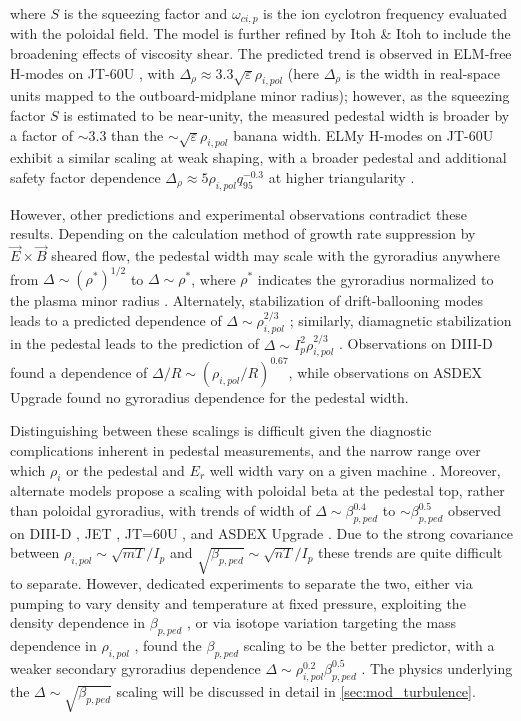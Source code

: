 \noindent where $S$ is the squeezing factor and $\omega_{ci,p}$ is the ion cyclotron frequency evaluated with the poloidal field.  The model is further refined by Itoh \& Itoh \cite{Itoh1996} to include the broadening effects of viscosity shear.  The predicted trend is observed in ELM-free H-modes on JT-60U \cite{Hatae1998}, with $\Delta_\rho \approx 3.3 \sqrt{\varepsilon} \rho_{i,pol}$ (here $\Delta_\rho$ is the width in real-space units mapped to the outboard-midplane minor radius); however, as the squeezing factor $S$ is estimated to be near-unity, the measured pedestal width is broader by a factor of $\sim 3.3$ than the $\sim \sqrt{\varepsilon} \rho_{i,pol}$ banana width.  ELMy H-modes on JT-60U exhibit a similar scaling at weak shaping, with a broader pedestal and additional safety factor dependence $\Delta_\rho \approx 5 \rho_{i,pol} q_{95}^{-0.3}$ at higher triangularity \cite{Kamada1999}.

However, other predictions and experimental observations contradict these results.  Depending on the calculation method of growth rate suppression by $\vec{E}\times\vec{B}$ sheared flow, the pedestal width may scale with the gyroradius anywhere from $\Delta \sim \left(\rho^*\right)^{1/2}$ to $\Delta \sim \rho^*$, where $\rho^*$ indicates the gyroradius normalized to the plasma minor radius \cite{Onjun2002,Beurskens2011}.  Alternately, stabilization of drift-ballooning modes leads to a predicted dependence of $\Delta \sim \rho_{i,pol}^{2/3}$ \cite{Wilson1997}; similarly, diamagnetic stabilization in the pedestal leads to the prediction of $\Delta \sim I_p^2 \rho_{i,pol}^{2/3}$ \cite{Rogers1999}.  Observations on DIII-D \cite{Osborne1998} found a dependence of $\Delta/R \sim (\rho_{i,pol}/R)^{0.67}$, while observations on ASDEX Upgrade \cite{Beurskens2011,Suttrop2000a} found no gyroradius dependence for the pedestal width.

Distinguishing between these scalings is difficult given the diagnostic complications inherent in pedestal measurements, and the narrow range over which $\rho_i$ or the pedestal and $E_r$ well width vary on a given machine \cite{Gohil1998,Maggi2010}.  Moreover, alternate models propose a scaling with poloidal beta at the pedestal top, rather than poloidal gyroradius, with trends of width of $\Delta \sim \beta_{p,ped}^{0.4}$ to $\sim \beta_{p,ped}^{0.5}$ observed on DIII-D \cite{Osborne1998,Groebner1998a}, JET \cite{Maggi2010}, JT=60U \cite{Urano2008}, and ASDEX Upgrade \cite{Beurskens2011}.  Due to the strong covariance between $\rho_{i,pol} \sim \sqrt{mT}/I_p$ and $\sqrt{\beta_{p,ped}} \sim \sqrt{nT}/I_p$ these trends are quite difficult to separate.  However, dedicated experiments to separate the two, either via pumping to vary density and temperature at fixed pressure, exploiting the density dependence in $\beta_{p,ped}$ \cite{Osborne1998}, or via isotope variation targeting the mass dependence in $\rho_{i,pol}$ \cite{Urano2008,Saibene1999}, found the $\beta_{p,ped}$ scaling to be the better predictor, with a weaker secondary gyroradius dependence $\Delta \sim \rho_{i,pol}^{0.2} \beta_{p,ped}^{0.5}$ \cite{Urano2008,Maggi2010}.  The physics underlying the $\Delta \sim \sqrt{\beta_{p,ped}}$ scaling will be discussed in detail in \cref{sec:mod_turbulence}.\nicesectionending

